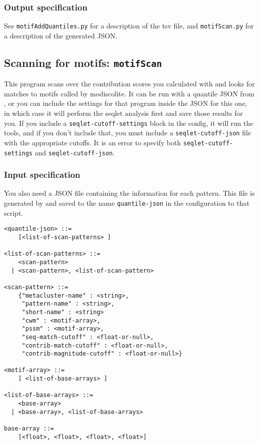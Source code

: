 \documentclass{article}
\begin{document}
\subsubsection{Output specification}
See \texttt{motifAddQuantiles.py} for a description of the tsv file,
and \texttt{motifScan.py} for a description of the generated JSON.


\newpage


\subsection{Scanning for motifs: \texttt{motifScan}}\label{prog:motifScan}

This program scans over the contribution scores you calculated with
 and looks for matches to motifs called by modiscolite.
It can be run with a quantile JSON from , or you can
include the settings for that program inside the JSON for this one, in which
case it will perform the seqlet analysis first and save those results for you.
If you include a \texttt{seqlet-cutoff-settings} block in the config, it will
run the  tools, and if you don't include that, you
must include a \texttt{seqlet-cutoff-json} file with the appropriate cutoffs.
It is an error to specify both \texttt{seqlet-cutoff-settings} and
\texttt{seqlet-cutoff-json}.


\subsubsection{Input specification}



You also need a JSON file containing the information for each pattern.
This file is generated by  and saved to the name
\texttt{quantile-json} in the configuration to that script.

\begin{lstlisting}
<quantile-json> ::=
    [<list-of-scan-patterns> ]

<list-of-scan-patterns> ::=
    <scan-pattern>
  | <scan-pattern>, <list-of-scan-pattern>

<scan-pattern> ::=
    {"metacluster-name" : <string>,
     "pattern-name" : <string>,
     "short-name" : <string>
     "cwm" : <motif-array>,
     "pssm" : <motif-array>,
     "seq-match-cutoff" : <float-or-null>,
     "contrib-match-cutoff" : <float-or-null>,
     "contrib-magnitude-cutoff" : <float-or-null>}

<motif-array> ::=
    [ <list-of-base-arrays> ]

<list-of-base-arrays> ::=
    <base-array>
  | <base-array>, <list-of-base-arrays>

base-array ::=
    [<float>, <float>, <float>, <float>]
\end{lstlisting}
\end{document}
